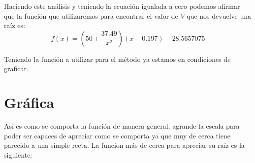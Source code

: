 \documentclass{article}
\begin{document}
Haciendo este análisis y teniendo la ecuación igualada a cero podemos afirmar que la función que utilizaremos para encontrar el valor de $V$ que nos devuelve una raíz es:
$$f(x) = (50+\frac{37.49}{x^2})(x-0.197)-28.5657075$$


Teniendo la función a utilizar para el método ya estamos en condiciones de graficar.

\section{Gráfica}
 \begin{figure}[h]
    \centering
    
 \end{figure}

Así es como se comporta la función de manera general, agrande la escala para poder ser capaces de apreciar como se comporta ya que muy de cerca tiene parecido a una simple recta. 
La funcion más de cerca para apreciar su raíz es la siguiente:
        
\begin{figure}[h]
    \centering
\end{figure}
\end{document}
